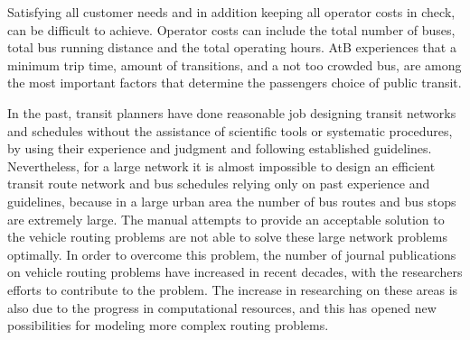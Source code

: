 
Satisfying all customer needs and in addition keeping all operator costs in check, can be difficult to achieve. Operator costs can include the total number of buses, total bus running distance and the total operating hours. AtB experiences that a minimum trip time, amount of transitions, and a not too crowded bus, are among the most important factors that determine the passengers choice of public transit. 

In the past, transit planners have done reasonable job designing transit networks and schedules without the assistance of scientific tools or systematic procedures, by using their experience and judgment and following established guidelines. Nevertheless, for a large network it is almost impossible to design an efficient transit route network and bus schedules relying only on past experience and guidelines, because in a large urban area the number of bus routes and bus stops are extremely large. The manual attempts to provide an acceptable solution to the vehicle routing problems are not able to solve these large network problems optimally. In order to overcome this problem, the number of journal publications on vehicle routing problems have increased in recent decades, with the researchers efforts to contribute to the problem.  The increase in researching on these areas is also due to the progress in computational resources, and this has opened new possibilities for modeling more complex routing problems. %


